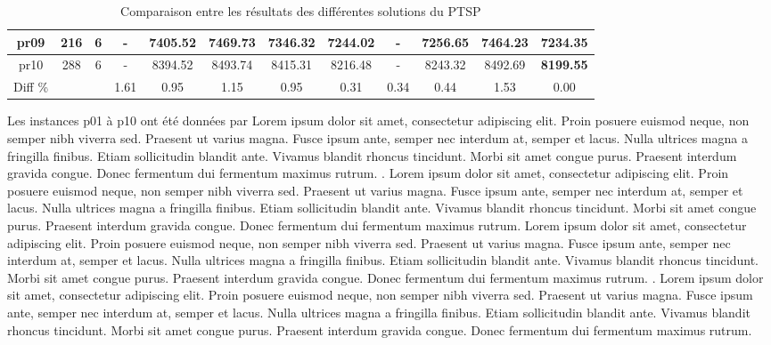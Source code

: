 \begin{table}[h!]
\begin{tabular}{|c|c|c|c|c|c|c|c|c|c|c|c|}
    pr09     & 216 & 6  & -               & 7405.52          & 7469.73          & 7346.32          & 7244.02          & -                & 7256.65          & 7464.23          & \textbf{7234.35} \\\hline
    pr10     & 288 & 6  & -               & 8394.52          & 8493.74          & 8415.31          & 8216.48          & -                & 8243.32          & 8492.69          & \textbf{8199.55} \\\hline
    Diff \%  &     &    & 1.61            & 0.95             & 1.15             & 0.95             & 0.31             & 0.34             & 0.44             & 1.53             & 0.00             \\\hline
  \end{tabular}
  \caption{Comparaison entre les résultats des différentes solutions du PTSP}
  \label{tab:ptsp-results-comparison}
\end{table}
\FloatBarrier

\medskip

Les instances p01 à p10 ont été données par \parencite{eilon_distribution_1971} Lorem ipsum dolor sit amet, consectetur adipiscing elit. Proin posuere euismod neque, non semper nibh viverra sed. Praesent ut varius magna. Fusce ipsum ante, semper nec interdum at, semper et lacus. Nulla ultrices magna a fringilla finibus. Etiam sollicitudin blandit ante. Vivamus blandit rhoncus tincidunt. Morbi sit amet congue purus. Praesent interdum gravida congue. Donec fermentum dui fermentum maximus rutrum. \parencite{christofides_period_1984}. Lorem ipsum dolor sit amet, consectetur adipiscing elit. Proin posuere euismod neque, non semper nibh viverra sed. Praesent ut varius magna. Fusce ipsum ante, semper nec interdum at, semper et lacus. Nulla ultrices magna a fringilla finibus. Etiam sollicitudin blandit ante. Vivamus blandit rhoncus tincidunt. Morbi sit amet congue purus. Praesent interdum gravida congue. Donec fermentum dui fermentum maximus rutrum. \parencite{chao_new_1995} Lorem ipsum dolor sit amet, consectetur adipiscing elit. Proin posuere euismod neque, non semper nibh viverra sed. Praesent ut varius magna. Fusce ipsum ante, semper nec interdum at, semper et lacus. Nulla ultrices magna a fringilla finibus. Etiam sollicitudin blandit ante. Vivamus blandit rhoncus tincidunt. Morbi sit amet congue purus. Praesent interdum gravida congue. Donec fermentum dui fermentum maximus rutrum. \parencite{cordeau_tabu_1997}. Lorem ipsum dolor sit amet, consectetur adipiscing elit. Proin posuere euismod neque, non semper nibh viverra sed. Praesent ut varius magna. Fusce ipsum ante, semper nec interdum at, semper et lacus. Nulla ultrices magna a fringilla finibus. Etiam sollicitudin blandit ante. Vivamus blandit rhoncus tincidunt. Morbi sit amet congue purus. Praesent interdum gravida congue. Donec fermentum dui fermentum maximus rutrum.

